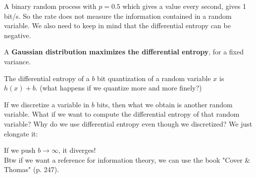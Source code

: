\documentclass[a4paper, 12pt]{book}
\begin{document}
A binary random process with $p=0.5$ which gives a value every second, gives 1 bit/s.
So the rate does not measure the information contained in a random variable.
We also need to keep in mind that the differential entropy can be negative.

\begin{theorem}
    A \textbf{Gaussian distribution maximizes the differential entropy}, for a fixed variance.
\end{theorem}

The differential entropy of a $b$ bit quantization of a random variable $x$ is $h(x)+b$.
(what happens if we quantize more and more finely?)

If we discretize a variable in $b$ bits, then what we obtain is another random variable. What if we want to compute the differential entropy of that random variable?
Why do we use differential entropy even though we discretized? We just elongate it:

\begin{center}
\begin{minipage}{0.45\textwidth}
\end{minipage}
\hfill
\begin{minipage}{0.45\textwidth}
    If we push $b \to \infty$, it diverges!\\
    Btw if we want a reference for information theory, we can use the book "Cover \& Thomas" (p. 247).
\end{minipage}
\end{center}
\end{document}
